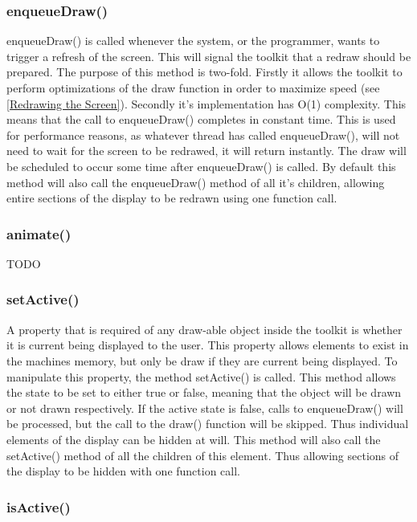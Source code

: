 \subsubsection{enqueueDraw()}

enqueueDraw() is called whenever the system, or the programmer, wants to trigger a refresh of the screen. This will signal the toolkit that a redraw should be prepared. The purpose of this method is two-fold. Firstly it allows the toolkit to perform optimizations of the draw function in order to maximize speed (see \ref{Redrawing the Screen}). Secondly it's implementation has O(1) complexity. This means that the call to enqueueDraw() completes in constant time. This is used for performance reasons, as whatever thread has called enqueueDraw(), will not need to wait for the screen to be redrawed, it will return instantly. The draw will be scheduled to occur some time after enqueueDraw() is called. By default this method will also call the enqueueDraw() method of all it's children, allowing entire sections of the display to be redrawn using one function call.

\subsubsection{animate()}
TODO

\subsubsection{setActive()}

A property that is required of any draw-able object inside the toolkit is whether it is current being displayed to the user. This property allows elements to exist in the machines memory, but only be draw if they are current being displayed. To manipulate this property, the method setActive() is called. This method allows the state to be set to either true or false, meaning that the object will be drawn or not drawn respectively. If the active state is false, calls to enqueueDraw() will be processed, but the call to the draw() function will be skipped. Thus individual elements of the display can be hidden at will. This method will also call the setActive() method of all the children of this element. Thus allowing sections of the display to be hidden with one function call.

\subsubsection{isActive()}

